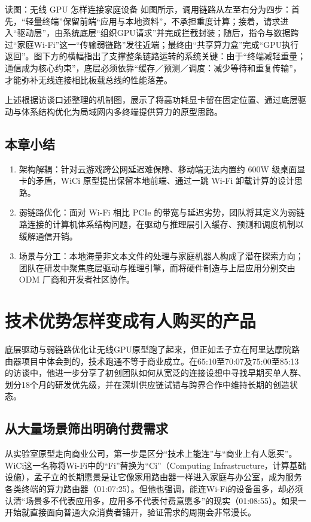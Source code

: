 \documentclass[UTF8,a4paper,11pt,fontset=fandol]{ctexart}
\begin{document}
\begin{knowledgebox}{读图：无线 GPU 怎样连接家庭设备}
如图所示，调用链路从左至右分为四步：首先，“轻量终端”保留前端“应用与本地资料”，不承担重度计算；接着，请求进入“驱动层”，由系统底层“组织GPU请求”并完成拦截封装；随后，指令与数据跨过“家庭Wi-Fi”这一“传输弱链路”发往近端；最终由“共享算力盒”完成“GPU执行返回”。图下方的横幅指出了支撑整条链路运转的系统关键：由于“终端减轻重量；通信成为核心约束”，底层必须依靠“缓存／预测／调度：减少等待和重复传输”，才能弥补无线连接相比板载总线的性能落差。
\end{knowledgebox}
上述根据访谈口述整理的机制图，展示了将高功耗显卡留在固定位置、通过底层驱动与体系结构优化为局域网内多终端提供算力的原型思路。
\subsection{本章小结}
\begin{enumerate}
\item 架构解耦：针对云游戏跨公网延迟难保障、移动端无法内置约 600W 级桌面显卡的矛盾，WiCi 原型提出保留本地前端、通过一跳 Wi-Fi 卸载计算的设计思路。
\item 弱链路优化：面对 Wi-Fi 相比 PCIe 的带宽与延迟劣势，团队将其定义为弱链路连接的计算机体系结构问题，在驱动与推理层引入缓存、预测和调度机制以缓解通信开销。
\item 场景与分工：本地海量非文本文件的处理与家庭机器人构成了潜在探索方向；团队在研发中聚焦底层驱动与推理引擎，而将硬件制造与上层应用分别交由 ODM 厂商和开发者社区协作。
\end{enumerate}
\section{技术优势怎样变成有人购买的产品}
底层驱动与弱链路优化让无线GPU原型跑了起来，但正如孟子立在阿里达摩院路由器项目中体会到的，技术跑通不等于商业成立。在65:10至70:07及75:00至85:13的访谈中，他进一步分享了初创团队如何从宽泛的连接设想中寻找早期买单人群、划分18个月的研发优先级，并在深圳供应链试错与跨界合作中维持长期的创造状态。
\subsection{从大量场景筛出明确付费需求}
从实验室原型走向商业公司，第一步是区分“技术上能连”与“商业上有人愿买”。WiCi这一名称将Wi-Fi中的“Fi”替换为“Ci”（Computing Infrastructure，计算基础设施），孟子立的长期愿景是让它像家用路由器一样进入家庭与办公室，成为服务各类终端的算力路由器（01:07:25）。但他也强调，能连Wi-Fi的设备虽多，却必须认清“场景多不代表应用多，应用多不代表付费意愿多”的现实（01:08:55）。如果一开始就直接面向普通大众消费者铺开，验证需求的周期会非常漫长。
\end{document}
